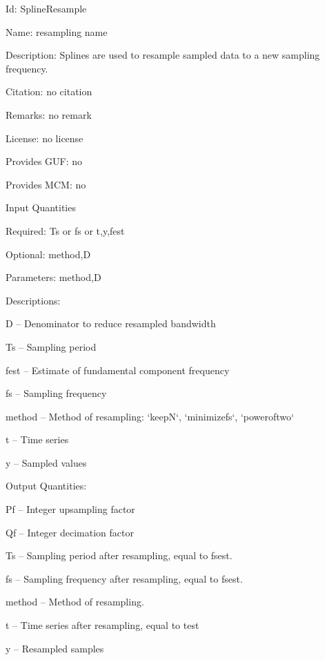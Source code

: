 \begin{tightdesc}
\item [Id:] SplineResample
\item [Name:] resampling name
\item [Description:] Splines are used to resample sampled data to a new sampling frequency.
\item [Citation:] no citation
\item [Remarks:] no remark
\item [License:] no license
\item [Provides GUF:] no
\item [Provides MCM:] no
\item [Input Quantities] \rule{0em}{0em}
    \begin{tightdesc}
    \item [Required:] 
        \textsf{Ts} or \textsf{fs} or \textsf{t},\enspace \textsf{y},\enspace \textsf{fest}
    \item [Optional:] 
        \textsf{method},\enspace \textsf{D}
    \item [Parameters:] 
        \textsf{method},\enspace \textsf{D}
    \item [Descriptions:] \rule{0em}{0em}
        \begin{tightdesc}
            \item[\textsf{D}] -- Denominator to reduce resampled bandwidth
            \item[\textsf{Ts}] -- Sampling period
            \item[\textsf{fest}] -- Estimate of fundamental component frequency
            \item[\textsf{fs}] -- Sampling frequency
            \item[\textsf{method}] -- Method of resampling: `keepN`, `minimizefs`, `poweroftwo`
            \item[\textsf{t}] -- Time series
            \item[\textsf{y}] -- Sampled values
        \end{tightdesc}
    \end{tightdesc}
\item [Output Quantities:] \rule{0em}{0em}
    \begin{tightdesc}
        \item[\textsf{Pf}] -- Integer upsampling factor
        \item[\textsf{Qf}] -- Integer decimation factor
        \item[\textsf{Ts}] -- Sampling period after resampling, equal to fsest.
        \item[\textsf{fs}] -- Sampling frequency after resampling, equal to fsest.
        \item[\textsf{method}] -- Method of resampling.
        \item[\textsf{t}] -- Time series after resampling, equal to test
        \item[\textsf{y}] -- Resampled samples
    \end{tightdesc}
\end{tightdesc}

